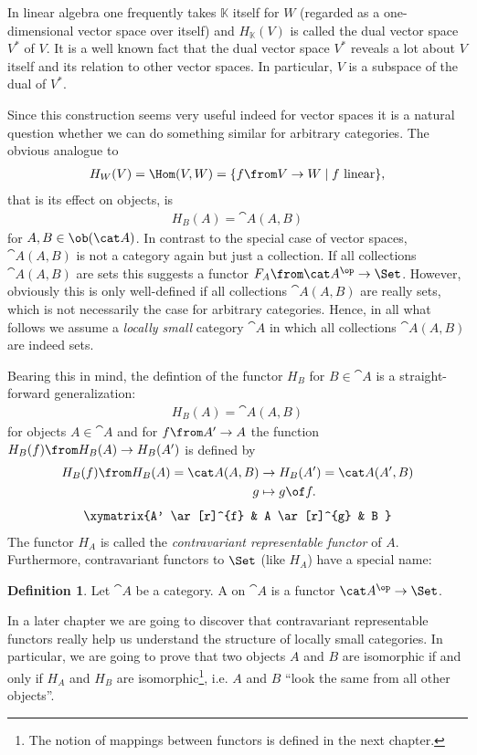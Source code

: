 \documentclass{article}
\theoremstyle{definition}
\newtheorem{definition}{Definition}
\begin{document}
In linear algebra one frequently takes $\mathbb K$ itself for $W$ (regarded as a one-dimensional vector space over itself) and $H_{\mathbb K}(V)$ is called the dual vector space $V^*$ of $V$. It is a well known fact that the dual vector space $V^*$ reveals a lot about $V$ itself and its relation to other vector spaces. In particular, $V$ is a subspace of the dual of $V^*$.

Since this construction seems very useful indeed for vector spaces it is a natural question whether we can do something similar for arbitrary categories.
The obvious analogue to
\begin{align*}
  H_W(V)=\Hom(V,W)=\{f\from V\to W\mid f \text{ linear}\},
\end{align*}
 that is its effect on objects, is
\begin{align*}
  H_B(A)=\cat A(A,B)
\end{align*}
for $A,B\in\ob(\cat A)$. In contrast to the special case of vector spaces, $\cat A(A,B)$ is not a category again but just a collection. If all collections $\cat A(A,B)$ are sets this suggests a functor $F_A\from\cat A^\op\to\Set$. However, obviously this is only well-defined if all collections $\cat A(A,B)$ are really sets, which is not necessarily the case for arbitrary categories. Hence, in all what follows we assume a \emph{locally small} category $\cat A$ in which all collections $\cat A(A,B)$ are indeed sets.

Bearing this in mind, the defintion of the functor $H_B$ for $B\in\cat A$ is a straight-forward generalization:
\begin{align*}
  H_B(A)=\cat A(A,B)
\end{align*}
for objects $A\in\cat A$ and for $f\from A'\to A$ the function $H_B(f)\from H_B(A)\to H_B(A')$ is defined by
\begin{align*}
  H_B(f)\from H_B(A)=\cat A(A,B)&\to H_B(A')=\cat A(A',B)\\
  g&\mapsto g\of f.
\end{align*}
\vspace{-0.7cm}
\begin{align*}
  \xymatrix{A' \ar[r]^{f} & A \ar[r]^{g} & B }
\end{align*}
The functor $H_A$ is called the \emph{contravariant representable functor} of $A$. Furthermore, contravariant functors to $\Set$ (like $H_A$) have a special name:
\begin{definition}
  Let $\cat A$ be a category. A  on $\cat A$ is a functor $\cat A^\op\to\Set$.
\end{definition}
In a later chapter we are going to discover that contravariant representable functors really help us understand the structure of locally small categories. In particular, we are going to prove that two objects $A$ and $B$ are isomorphic if and only if $H_A$ and $H_B$ are isomorphic\footnote{The notion of mappings between functors is defined in the next chapter.}, i.e. $A$ and $B$ ``look the same from all other objects''.
\end{document}
